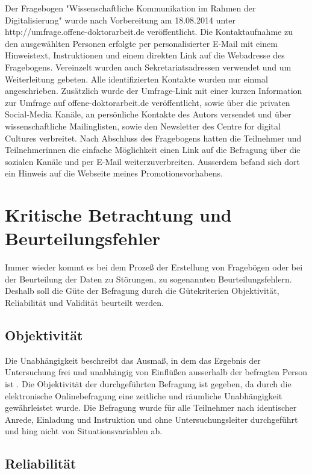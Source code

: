 Der Fragebogen "Wissenschaftliche Kommunikation im Rahmen der Digitalisierung" wurde nach Vorbereitung am 18.08.2014 unter http://umfrage.offene-doktorarbeit.de veröffentlicht. Die Kontaktaufnahme zu den ausgewählten Personen erfolgte per personalisierter E-Mail mit einem Hinweistext, Instruktionen und einem direkten Link auf die Webadresse des Fragebogens. Vereinzelt wurden auch Sekretariatsadressen verwendet und um Weiterleitung gebeten. Alle identifizierten Kontakte wurden nur einmal angeschrieben. Zusätzlich wurde der Umfrage-Link mit einer kurzen Information zur Umfrage auf offene-doktorarbeit.de veröffentlicht, sowie über die privaten Social-Media Kanäle, an persönliche Kontakte des Autors versendet und über wissenschaftliche Mailinglisten, sowie den Newsletter des Centre for digital Cultures verbreitet. Nach Abschluss des Fragebogens hatten die Teilnehmer und Teilnehmerinnen die einfache Möglichkeit einen Link auf die Befragung  über die sozialen Kanäle und per E-Mail weiterzuverbreiten. Ausserdem befand sich dort ein Hinweis auf die Webseite meines Promotionsvorhabens.

\section{Kritische Betrachtung und Beurteilungsfehler}

Immer wieder kommt es bei dem Prozeß der Erstellung von Fragebögen oder bei der Beurteilung der Daten zu Störungen, zu sogenannten Beurteilungsfehlern. Deshalb soll die Güte der Befragung durch
die Gütekriterien Objektivität, Reliabilität und Validität beurteilt werden.

\subsection{Objektivität}

Die Unabhängigkeit beschreibt das Ausmaß, in dem das Ergebnis der Untersuchung frei und unabhängig von Einflüßen ausserhalb der befragten Person ist \cite{rost_2004_lehrbuch}. Die Objektivität der durchgeführten Befragung ist gegeben, da durch die elektronische Onlinebefragung eine zeitliche und räumliche Unabhängigkeit gewährleistet wurde. Die Befragung wurde für alle Teilnehmer nach identischer Anrede, Einladung und Instruktion und ohne Untersuchungsleiter durchgeführt und hing nicht von Situationsvariablen ab.

\subsection{Reliabilität}

